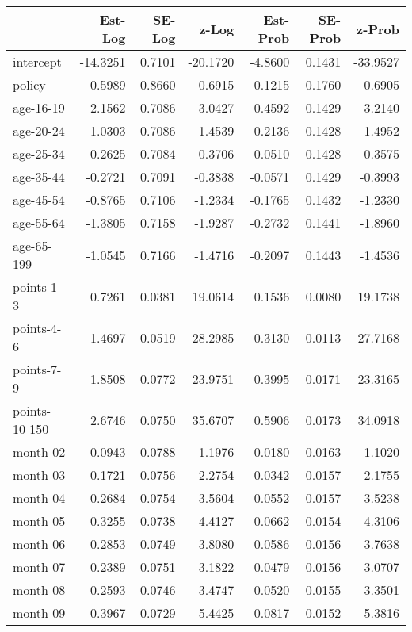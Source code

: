 \documentclass[10pt]{article}
\begin{document}
\begin{table}[ht]
\centering
\begin{tabular}{lrrrrrr}
  \hline
 & Est-Log & SE-Log & z-Log & Est-Prob & SE-Prob & z-Prob \\ 
  \hline
intercept & -14.3251 & 0.7101 & -20.1720 & -4.8600 & 0.1431 & -33.9527 \\ 
  policy & 0.5989 & 0.8660 & 0.6915 & 0.1215 & 0.1760 & 0.6905 \\ 
  age-16-19 & 2.1562 & 0.7086 & 3.0427 & 0.4592 & 0.1429 & 3.2140 \\ 
  age-20-24 & 1.0303 & 0.7086 & 1.4539 & 0.2136 & 0.1428 & 1.4952 \\ 
  age-25-34 & 0.2625 & 0.7084 & 0.3706 & 0.0510 & 0.1428 & 0.3575 \\ 
  age-35-44 & -0.2721 & 0.7091 & -0.3838 & -0.0571 & 0.1429 & -0.3993 \\ 
  age-45-54 & -0.8765 & 0.7106 & -1.2334 & -0.1765 & 0.1432 & -1.2330 \\ 
  age-55-64 & -1.3805 & 0.7158 & -1.9287 & -0.2732 & 0.1441 & -1.8960 \\ 
  age-65-199 & -1.0545 & 0.7166 & -1.4716 & -0.2097 & 0.1443 & -1.4536 \\ 
  points-1-3 & 0.7261 & 0.0381 & 19.0614 & 0.1536 & 0.0080 & 19.1738 \\ 
  points-4-6 & 1.4697 & 0.0519 & 28.2985 & 0.3130 & 0.0113 & 27.7168 \\ 
  points-7-9 & 1.8508 & 0.0772 & 23.9751 & 0.3995 & 0.0171 & 23.3165 \\ 
  points-10-150 & 2.6746 & 0.0750 & 35.6707 & 0.5906 & 0.0173 & 34.0918 \\ 
  month-02 & 0.0943 & 0.0788 & 1.1976 & 0.0180 & 0.0163 & 1.1020 \\ 
  month-03 & 0.1721 & 0.0756 & 2.2754 & 0.0342 & 0.0157 & 2.1755 \\ 
  month-04 & 0.2684 & 0.0754 & 3.5604 & 0.0552 & 0.0157 & 3.5238 \\ 
  month-05 & 0.3255 & 0.0738 & 4.4127 & 0.0662 & 0.0154 & 4.3106 \\ 
  month-06 & 0.2853 & 0.0749 & 3.8080 & 0.0586 & 0.0156 & 3.7638 \\ 
  month-07 & 0.2389 & 0.0751 & 3.1822 & 0.0479 & 0.0156 & 3.0707 \\ 
  month-08 & 0.2593 & 0.0746 & 3.4747 & 0.0520 & 0.0155 & 3.3501 \\ 
  month-09 & 0.3967 & 0.0729 & 5.4425 & 0.0817 & 0.0152 & 5.3816 \\ 

\end{tabular}
\end{table}
\end{document}
